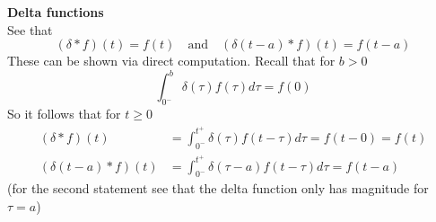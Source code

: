 \documentclass{report}
\begin{document}
\textbf{Delta functions}\\
See that
\begin{equation*}
(\delta*f)(t)=f(t)\quad\text{and}\quad(\delta(t-a)*f)(t)=f(t-a)
\end{equation*}
These can be shown via direct computation. Recall that for $b>0$
\begin{equation*}
\int^b_{0^-}\delta(\tau)f(\tau)d\tau=f(0)
\end{equation*}
So it follows that for $t\geq0$
\begin{align*}
(\delta*f)(t)&=\int^{t^+}_{0^-}\delta(\tau)f(t-\tau)d\tau=
f(t-0)=f(t)\\
(\delta(t-a)*f)(t)&=\int^{t^+}_{0^-}\delta(\tau-a)f(t-\tau)d\tau=f(t-a)
\end{align*}
(for the second statement see that the delta function only has magnitude for $\tau=a$) 
\newpage
\end{document}

